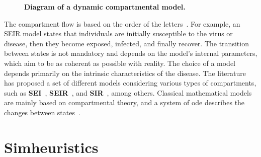 \begin{figure}[!ht]
{
	
	} \caption{\textbf{Diagram of a dynamic compartmental model.}}
	\label{fig:dynamicmodel}
\end{figure}

The compartment flow is based on the order of the letters~\citep{amaku:2014}.
For example, an SEIR model states that individuals are initially susceptible to
the virus or disease, then they become exposed, infected, and finally recover.
The transition between states is not mandatory and depends on the model's
internal parameters, which aim to be as coherent as possible with reality. The
choice of a model depends primarily on the intrinsic characteristics of the
disease. The literature has proposed a set of different models considering
various types of compartments, such as \textbf{SEI}~\cite{Scoglio2021,
	Puntipa2023}, \textbf{SEIR}~\cite{Scoglio2021, Puntipa2023, Meng2023,
	da-silva:2020}, and \textbf{SIR}~\cite{Umar2022, Prasetyo2023, Srivastav2023},
among others.  Classical mathematical models are mainly based on compartmental
theory, and a system of \gls{ode} describes the changes between
states~\citep{da-silva:2020}.

\section{Simheuristics}\label{sec:simheuristics}

